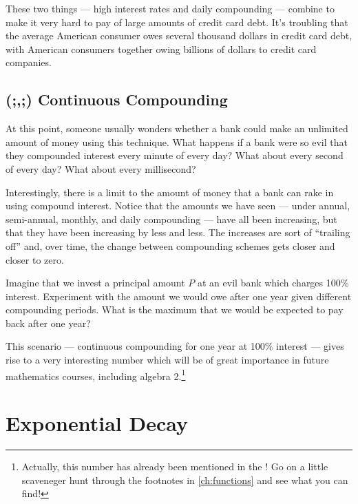 These two things --- high interest rates and daily compounding --- combine to make it very hard to pay of large amounts of credit card debt. It's troubling that the average American consumer owes several thousand dollars in credit card debt, with American consumers together owing billions of dollars to credit card companies.


\subsection{(;,;) Continuous Compounding}

At this point, someone usually wonders whether a bank could make an unlimited amount of money using this technique. What happens if a bank were so evil that they compounded interest every minute of every day? What about every second of every day? What about every millisecond?

Interestingly, there is a limit to the amount of money that a bank can rake in using compound interest. Notice that the amounts we have seen --- under annual, semi-annual, monthly, and daily compounding --- have all been increasing, but that they have been increasing by less and less. The increases are sort of ``trailing off'' and, over time, the change between compounding schemes gets closer and closer to zero.

\begin{boxedexplore}

Imagine that we invest a principal amount $P$ at an evil bank which charges 100\% interest. Experiment with the amount we would owe after one year given different compounding periods. What is the maximum that we would be expected to pay back after one year?
\end{boxedexplore}

This scenario --- continuous compounding for one year at 100\% interest --- gives rise to a very interesting number which will be of great importance in future mathematics courses, including algebra 2.\footnote{Actually, this number has already been mentioned in the \algebranomicon! Go on a little scaveneger hunt through the footnotes in \cref{ch:functions} and see what you can find!}

\section{Exponential Decay}
\label{sec:expodecay}

